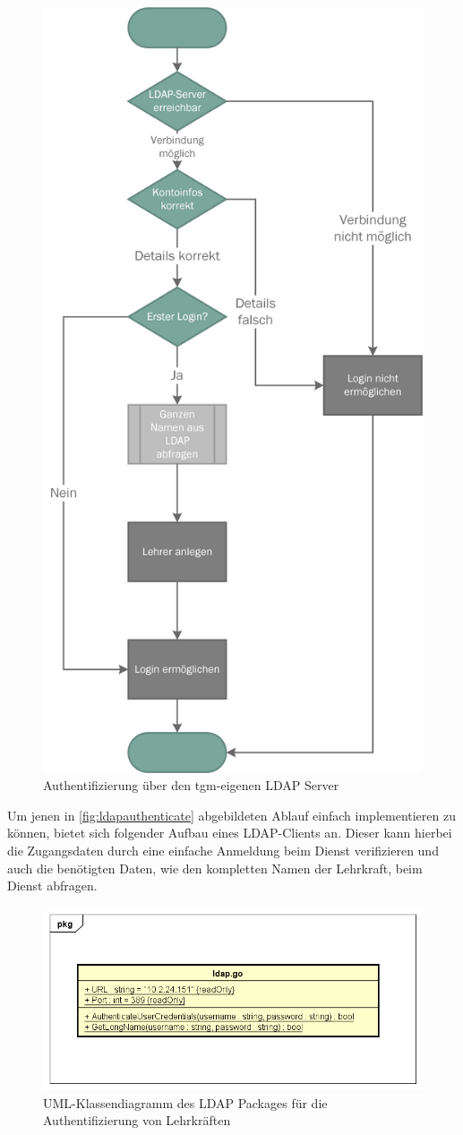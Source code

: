 \begin{figure}[H]
	\centering
	\includegraphics[width=0.5\linewidth]{images/mbeier_konzept/LDAP_Authenticate}
	\caption[Authentifizierung über LDAP]{Authentifizierung über den tgm-eigenen LDAP Server}
	\label{fig:ldapauthenticate}
\end{figure}

\newpage

Um jenen in \autoref{fig:ldapauthenticate} abgebildeten Ablauf einfach implementieren zu können, bietet sich folgender Aufbau eines LDAP-Clients an. Dieser kann hierbei die Zugangsdaten durch eine einfache Anmeldung beim Dienst verifizieren und auch die benötigten Daten, wie den kompletten Namen der Lehrkraft, beim Dienst abfragen.

\begin{figure}[H]
	\centering
	\includegraphics[width=\linewidth]{images/mbeier_konzept/LDAP}
	\caption[lLDAP UML-Klassendiagramm]{UML-Klassendiagramm des LDAP Packages für die Authentifizierung von Lehrkräften}
	\label{fig:ldap}
\end{figure}

